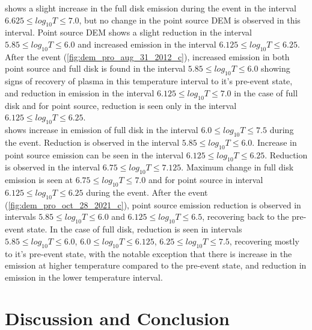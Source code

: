  shows a slight increase in the full disk emission during the event in the interval $6.625 \le log_{10}T \le 7.0$, but no change in the point source DEM is observed in this interval. Point source DEM shows a slight reduction in the interval $5.85 \le log_{10}T \le 6.0$ and increased emission in the interval $6.125 \le log_{10}T \le 6.25$. After the event (\cref{fig:dem_pro_aug_31_2012_c}), increased emission in both point source and full disk is found in the interval $5.85 \le log_{10}T \le 6.0$ showing signs of recovery of plasma in this temperature interval to it's pre-event state, and reduction in emission in the interval $6.125 \le log_{10}T \le 7.0$ in the case of full disk and for point source, reduction is seen only in the interval $6.125 \le log_{10}T \le 6.25$.\\

 shows increase in emission of full disk in the interval $6.0 \le log_{10}T \le 7.5$ during the event. Reduction is observed in the interval $5.85 \le log_{10}T \le 6.0$. Increase in point source emission can be seen in the interval $6.125 \le log_{10}T \le 6.25$. Reduction is observed in the interval $6.75 \le log_{10}T \le 7.125$. Maximum change in full disk emission is seen at $6.75 \le log_{10}T \le 7.0$ and for point source in interval $6.125 \le log_{10}T \le 6.25$ during the event. After the event (\cref{fig:dem_pro_oct_28_2021_c}), point source emission reduction is observed in intervals $5.85 \le log_{10}T \le 6.0$ and $6.125 \le log_{10}T \le 6.5$, recovering back to the pre-event state. In the case of full disk, reduction is seen in intervals $5.85 \le log_{10}T \le 6.0$, $6.0 \le log_{10}T \le 6.125$, $6.25 \le log_{10}T \le 7.5$, recovering mostly to it's pre-event state, with the notable exception that there is increase in the emission at higher temperature compared to the pre-event state, and reduction in emission in the lower temperature interval.

\section{Discussion and Conclusion}

